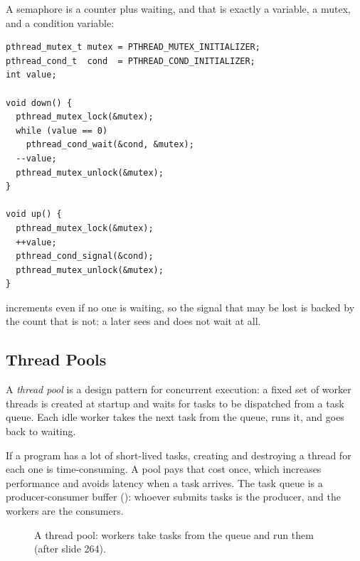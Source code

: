 \begin{example}
  A semaphore is a counter plus waiting, and that is exactly a variable, a mutex, and a condition variable:
\begin{lstlisting}[morekeywords={pthread_mutex_t,pthread_cond_t}]
pthread_mutex_t mutex = PTHREAD_MUTEX_INITIALIZER;
pthread_cond_t  cond  = PTHREAD_COND_INITIALIZER;
int value;

void down() {
  pthread_mutex_lock(&mutex);
  while (value == 0)
    pthread_cond_wait(&cond, &mutex);
  --value;
  pthread_mutex_unlock(&mutex);
}

void up() {
  pthread_mutex_lock(&mutex);
  ++value;
  pthread_cond_signal(&cond);
  pthread_mutex_unlock(&mutex);
}
\end{lstlisting}
   increments  even if no one is waiting, so the signal that may be lost is backed by the count that is not: a later  sees  and does not wait at all.
\end{example}

\subsection{Thread Pools}

\begin{definition}
  A \emph{thread pool} is a design pattern for concurrent execution: a fixed set of worker threads is created at startup and waits for tasks to be dispatched from a task queue. Each idle worker takes the next task from the queue, runs it, and goes back to waiting.
\end{definition}

If a program has a lot of short-lived tasks, creating and destroying a thread for each one is time-consuming. A pool pays that cost once, which increases performance and avoids latency when a task arrives. The task queue is a producer-consumer buffer (): whoever submits tasks is the producer, and the workers are the consumers.

\begin{figure}[htbp]
\centering
{}
\caption{A thread pool: workers take tasks from the queue and run them (after slide 264).}
\label{fig:threadpool}
\end{figure}

